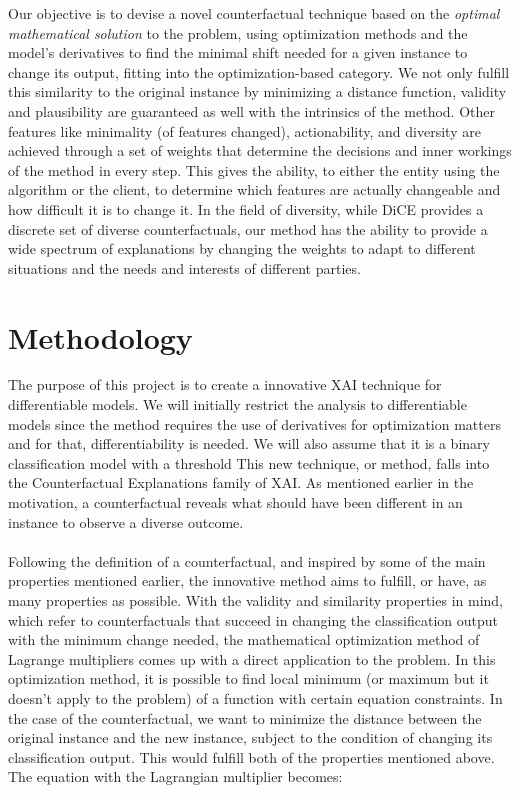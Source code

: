 \documentclass[12pt]{extarticle}
\numberwithin{equation}{section}
\begin{document}
Our objective is to devise a novel counterfactual technique based on the \emph{optimal mathematical solution} to the problem, using optimization methods and the model's derivatives to find the minimal shift needed for a given instance to change its output, fitting into the optimization-based category. We not only fulfill this similarity to the original instance by minimizing a distance function, validity and plausibility are guaranteed as well with the intrinsics of the method. Other features like minimality (of features changed), actionability, and diversity are achieved through a set of weights that determine the decisions and inner workings of the method in every step. This gives the ability, to either the entity using the algorithm or the client, to determine which features are actually changeable and how difficult it is to change it. In the field of diversity, while DiCE provides a discrete set of diverse counterfactuals, our method has the ability to provide a wide spectrum of explanations by changing the weights to adapt to different situations and the needs and interests of different parties.

\section{Methodology}
The purpose of this project is to create a innovative XAI technique for differentiable models. We will initially restrict the analysis to differentiable models since the method requires the use of derivatives for optimization matters and for that, differentiability is needed. We will also assume that it is a binary classification model with a threshold This new technique, or method, falls into the Counterfactual Explanations family of XAI. As mentioned earlier in the motivation, a counterfactual reveals what should have been different in an instance to observe a diverse outcome.\\
\\
Following the definition of a counterfactual, and inspired by some of the main properties mentioned earlier, the innovative method aims to fulfill, or have, as many properties as possible. With the validity and similarity properties in mind, which refer to counterfactuals that succeed in changing the classification output with the minimum change needed, the mathematical optimization method of Lagrange multipliers comes up with a direct application to the problem. In this optimization method, it is possible to find local minimum (or maximum but it doesn’t apply to the problem) of a function with certain equation constraints. In the case of the counterfactual, we want to minimize the distance between the original instance and the new instance, subject to the condition of changing its classification output. This would fulfill both of the properties mentioned above. The equation with the Lagrangian multiplier becomes:
\end{document}

